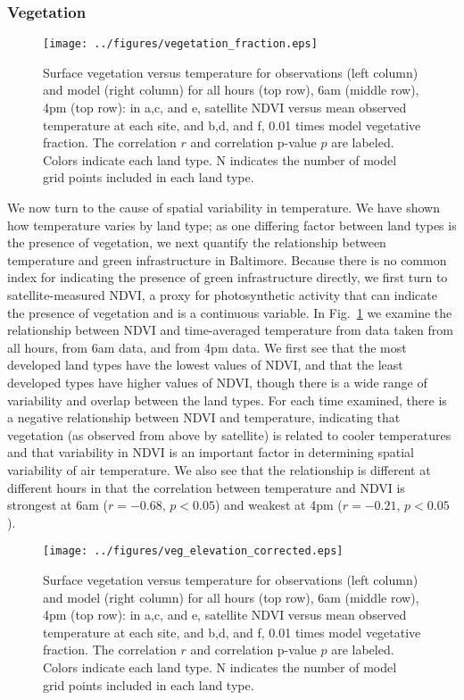 \documentclass[draft,linenumbers]{agujournal}
\begin{document}
\subsubsection{Vegetation}

\begin{figure}
\centering
\texttt{[image: ../figures/vegetation\_fraction.eps]}
\caption{Surface vegetation versus temperature for observations (left column) and model (right column) for all hours (top row), 6am (middle row), 4pm (top row): in a,c, and e, satellite NDVI versus mean observed temperature at each site, and b,d, and f, 0.01 times model vegetative fraction. The correlation $r$ and correlation p-value $p$ are labeled. Colors indicate each land type. N indicates the number of model grid points included in each land type.}
\label{fig:veg}
\end{figure}

We now turn to the cause of spatial variability in temperature. We have shown how temperature varies by land type; as one differing factor between land types is the presence of vegetation, we next quantify the relationship between temperature and green infrastructure in Baltimore. 
Because there is no common index for indicating the presence of green infrastructure directly, we first turn to satellite-measured NDVI, a proxy for photosynthetic activity that can indicate the presence of vegetation and is a continuous variable. 
In Fig.~\ref{fig:veg} we examine the relationship between NDVI and time-averaged temperature from data taken from all hours, from 6am data, and from 4pm data. We first see that the most developed land types have the lowest values of NDVI, and that the least developed types have higher values of NDVI, though there is a wide range of variability and overlap between the land types. For each time examined, there is a negative relationship between NDVI and temperature, indicating that vegetation (as observed from above by satellite) is related to cooler temperatures and  that variability in NDVI is an important factor in determining spatial variability of air temperature. We also see that the relationship is different at different hours in that the correlation between temperature and NDVI is strongest at 6am ($r = -0.68$, $p< 0.05$) and weakest at 4pm ($r= -0.21$, $p<0.05$). 

\begin{figure}
\centering
\texttt{[image: ../figures/veg\_elevation\_corrected.eps]}
\caption{Surface vegetation versus temperature for observations (left column) and model (right column) for all hours (top row), 6am (middle row), 4pm (top row): in a,c, and e, satellite NDVI versus mean observed temperature at each site, and b,d, and f, 0.01 times model vegetative fraction. The correlation $r$ and correlation p-value $p$ are labeled. Colors indicate each land type. N indicates the number of model grid points included in each land type.}
\label{fig:veg_elev_corrected}
\end{figure}
\end{document}

